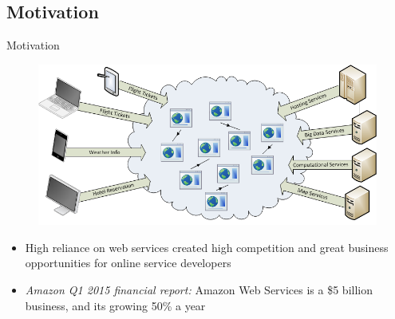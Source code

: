 \documentclass{beamer}
\begin{document}
\subsection{Motivation}


\begin{frame}{Motivation}
    \begin{figure}[htbp]
        \centering
        \includegraphics[width=0.9 \columnwidth]{figures/webservice_intro.png}
    \end{figure}
    \begin{itemize}
        \item High reliance on web services created high competition and great business opportunities for online service developers
        \item \emph{\color{blue}Amazon Q1 2015 financial report:} Amazon Web Services is a \$5 billion business, and its growing 50\% a year
    \end{itemize}
\end{frame}
\end{document}
